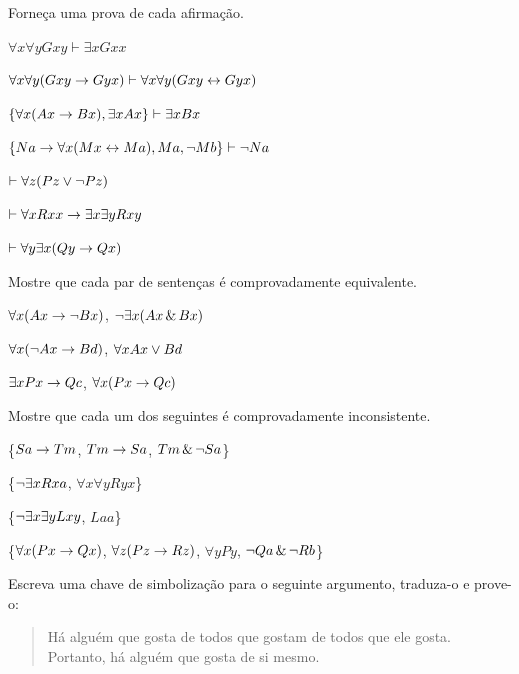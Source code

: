 \problempart
Forneça uma prova de cada afirmação.
\begin{earg}
\item $\forall x \forall y Gxy\vdash\exists x Gxx$
\item $\forall x \forall y (Gxy \rightarrow Gyx) \vdash \forall x\forall y (Gxy \leftrightarrow Gyx)$
\item $\{\forall x(Ax\rightarrow Bx), \exists x Ax\} \vdash \exists x Bx$
\item $\{Na \rightarrow \forall x(Mx \leftrightarrow Ma), Ma, \neg Mb\}\vdash \neg Na$
\item $\vdash\forall z (Pz \vee \neg Pz)$
\item $\vdash\forall x Rxx\rightarrow \exists x \exists y Rxy$
\item $\vdash\forall y \exists x (Qy \rightarrow Qx)$
\end{earg}



\problempart
Mostre que cada par de sentenças é comprovadamente equivalente.
\begin{earg}
\item $\forall x (Ax\rightarrow \neg Bx)$, $\neg\exists x(Ax \,\&\, Bx)$
\item $\forall x (\neg Ax\rightarrow Bd)$, $\forall x Ax \vee Bd$
\item $\exists x Px \rightarrow Qc$, $\forall x (Px \rightarrow Qc)$
\end{earg}



\problempart
Mostre que cada um dos seguintes é comprovadamente inconsistente.
\begin{earg}
\item \{$Sa\rightarrow Tm$, $Tm \rightarrow Sa$, $Tm \,\&\, \neg Sa$\}
\item \{$\neg\exists x Rxa$, $\forall x \forall y Ryx$\}
\item \{$\neg\exists x \exists y Lxy$, $Laa$\}
\item \{$\forall x(Px \rightarrow Qx)$, $\forall z(Pz \rightarrow Rz)$, $\forall y Py$, $\neg Qa \,\&\, \neg Rb$\}
\end{earg}



\solutions
\problempart
\label{pr.likes}
Escreva uma chave de simbolização para o seguinte argumento, traduza-o e prove-o:
\begin{quote}
Há alguém que gosta de todos que gostam de todos que ele gosta. Portanto, há alguém que gosta de si mesmo.
\end{quote}

